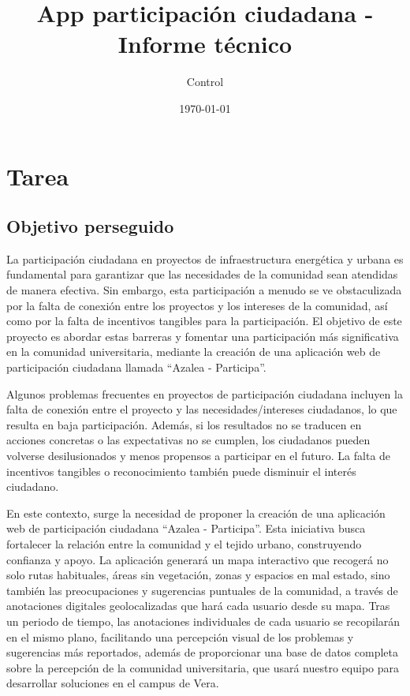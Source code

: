 \documentclass{article}
\title{App participación ciudadana - Informe técnico}
\author{Control}
\date{\today}
\begin{document}
 


\tableofcontents

\newpage

\section{Tarea}

\subsection{Objetivo perseguido}

La participación ciudadana en proyectos de infraestructura energética y urbana es fundamental para garantizar que las necesidades de la comunidad sean atendidas de manera efectiva. Sin embargo, esta participación a menudo se ve obstaculizada por la falta de conexión entre los proyectos y los intereses de la comunidad, así como por la falta de incentivos tangibles para la participación. El objetivo de este proyecto es abordar estas barreras y fomentar una participación más significativa en la comunidad universitaria, mediante la creación de una aplicación web de participación ciudadana llamada ``Azalea - Participa''.

Algunos problemas frecuentes en proyectos de participación ciudadana incluyen la falta de conexión entre el proyecto y las necesidades/intereses ciudadanos, lo que resulta en baja participación. Además, si los resultados no se traducen en acciones concretas o las expectativas no se cumplen, los ciudadanos pueden volverse desilusionados y menos propensos a participar en el futuro. La falta de incentivos tangibles o reconocimiento también puede disminuir el interés ciudadano.

En este contexto, surge la necesidad de proponer la creación de una aplicación web de participación ciudadana ``Azalea - Participa''. Esta iniciativa busca fortalecer la relación entre la comunidad y el tejido urbano, construyendo confianza y apoyo. La aplicación generará un mapa interactivo que recogerá no solo rutas habituales, áreas sin vegetación, zonas y espacios en mal estado, sino también las preocupaciones y sugerencias puntuales de la comunidad, a través de anotaciones digitales geolocalizadas que hará cada usuario desde su mapa. Tras un periodo de tiempo, las anotaciones individuales de cada usuario se recopilarán en el mismo plano, facilitando una percepción visual de los problemas y sugerencias más reportados, además de proporcionar una base de datos completa sobre la percepción de la comunidad universitaria, que usará nuestro equipo para desarrollar soluciones en el campus de Vera.
\end{document}

